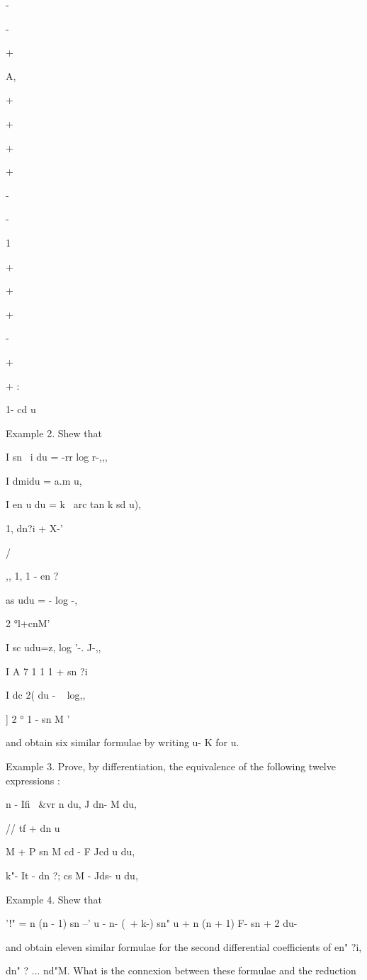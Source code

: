 -

-

+

A,

+

+

+

+

-

-

1

+

+

+

-

+

+ :

1- cd u

Example 2. Shew that

I sn \ i du = -rr log r-,,,

I dmidu = a.m u,

I en u du = k~ arc tan k sd u),

1, dn?i + X-'

/

,, 1, 1 - en ?

as udu = - log -,

2 °l+cnM'

I sc udu=z, log '-. J-,,

I A 7 1 1 1 + sn ?i

I dc 2( du - ~ log,,

] 2 ° 1 - sn M '

and obtain six similar formulae by writing u- K for u.


Example 3. Prove, by differentiation, the equivalence of the following
twelve expressions :

n - Ifi \ \&vr n du, J dn- M du,

// tf + dn u%

M + P sn M cd - F Jcd u du,

k"- It - dn ?; cs M - Jds- u du,

Example 4. Shew that

'!" = n (n - 1) sn --' u - n- (\ + k-) sn" u + n (n + 1) F- sn + 2 du-

and obtain eleven similar formulae for the second differential
coefficients of en" ?i,

dn" ? ... nd"M. What is the connexion between these formulae and the
reduction

